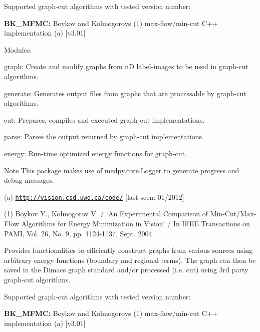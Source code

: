 Supported graph-\/cut algorithms with tested version number:\par

\begin{DoxyItemize}
\item {\bfseries BK\_\-MFMC:} Boykov and Kolmogorovs (1) max-\/flow/min-\/cut C++ implementation (a) \mbox{[}v3.01\mbox{]}
\end{DoxyItemize}

Modules:
\begin{DoxyItemize}
\item graph: Create and modify graphs from nD label-\/images to be used in graph-\/cut algorithms.
\item generate: Generates output files from graphs that are processable by graph-\/cut algorithms.
\item cut: Prepares, compiles and executed graph-\/cut implementations.
\item parse: Parses the output returned by graph-\/cut implementations.
\item energy: Run-\/time optimized energy functions for graph-\/cut.
\end{DoxyItemize}

\begin{DoxyNote}{Note}
This package makes use of  medpy.core.Logger to generate progress and debug messages.
\end{DoxyNote}
(a) \href{http://vision.csd.uwo.ca/code/}{\tt http://vision.csd.uwo.ca/code/} \mbox{[}last seen: 01/2012\mbox{]}

(1) Boykov Y., Kolmogorov V. / \char`\"{}An Experimental Comparison of Min-\/Cut/Max-\/Flow
 Algorithms for Energy Minimization in Vision\char`\"{} / In IEEE Transactions on PAMI, Vol. 26, No. 9, pp. 1124-\/1137, Sept. 2004

Provides functionalities to efficiently construct graphs from various sources using arbitrary energy functions (boundary and regional terms). The graph can then be saved in the Dimacs graph standard and/or processed (i.e. cut) using 3rd party graph-\/cut algorithms.

Supported graph-\/cut algorithms with tested version number:\par

\begin{DoxyItemize}
\item {\bfseries BK\_\-MFMC:} Boykov and Kolmogorovs (1) max-\/flow/min-\/cut C++ implementation (a) \mbox{[}v3.01\mbox{]}
\end{DoxyItemize}

